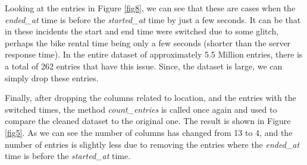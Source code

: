 \documentclass[12pt]{article}
\begin{document}
\begin{itemize}
Looking at the entries in Figure \ref{fig8}, we can see that these are cases when the \textit{ended\_at} time is before the \textit{started\_at} time by just a few seconds. It can be that in these incidents the start and end time were switched due to some glitch, perhaps the bike rental time being only a few seconds (shorter than the server response time). In the entire dataset of approximately 5.5 Million entries, there is a total of 262 entries that have this issue. Since, the dataset is large, we can simply drop these entries.


Finally, after dropping the columns related to location, and the entries with the switched times, the method \textit{count\_entries} is called once again and used to compare the cleaned dataset to the original one. The result is shown in Figure \ref{fig5}. As we can see the number of columns has changed from 13 to 4, and the number of entries is slightly less due to removing the entries where the \textit{ended\_at} time is before the \textit{started\_at} time. 
	

\end{itemize}
\end{document}
